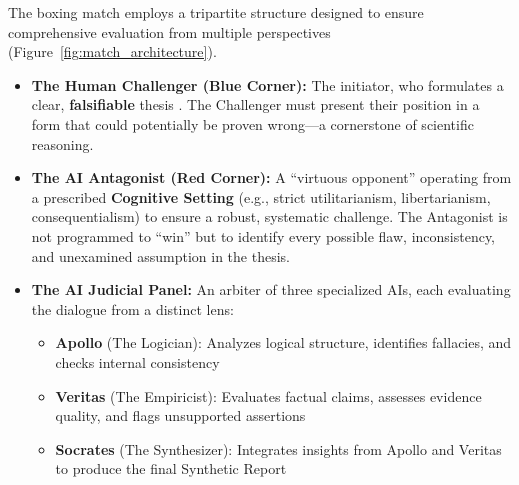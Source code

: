 \documentclass[11pt,a4paper]{article}
\begin{document}
The boxing match employs a tripartite structure designed to ensure comprehensive evaluation from multiple perspectives (Figure~\ref{fig:match_architecture}).

\begin{itemize}[leftmargin=*]
    \item \textbf{The Human Challenger (Blue Corner):} The initiator, who formulates a clear, \textbf{falsifiable} thesis \citep{Popper1959}. The Challenger must present their position in a form that could potentially be proven wrong---a cornerstone of scientific reasoning.
    
    \item \textbf{The AI Antagonist (Red Corner):} A ``virtuous opponent'' operating from a prescribed \textbf{Cognitive Setting} (e.g., strict utilitarianism, libertarianism, consequentialism) to ensure a robust, systematic challenge. The Antagonist is not programmed to ``win'' but to identify every possible flaw, inconsistency, and unexamined assumption in the thesis.
    
    \item \textbf{The AI Judicial Panel:} An arbiter of three specialized AIs, each evaluating the dialogue from a distinct lens:
    \begin{itemize}[nosep]
        \item \textbf{Apollo} (The Logician): Analyzes logical structure, identifies fallacies, and checks internal consistency
        \item \textbf{Veritas} (The Empiricist): Evaluates factual claims, assesses evidence quality, and flags unsupported assertions
        \item \textbf{Socrates} (The Synthesizer): Integrates insights from Apollo and Veritas to produce the final Synthetic Report
    \end{itemize}
\end{itemize}
\end{document}
